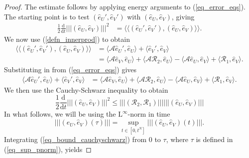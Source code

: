 \documentclass[12pt,a4paper]{article}
\numberwithin{equation}{section}
\theoremstyle{definition}
\newcommand{\pnorm}[1]{\left|\left|\left|#1\right|\right|\right|}
\newcommand{\leb}{\text{L}}
\newcommand{\innerprod}[1]{\langle\langle#1\rangle\rangle}
\newcommand{\innerprodsingle}[1]{\langle#1\rangle}
\newcommand{\qp}[1]{\left(#1\right)}
\newcommand{\qb}[1]{\left[#1\right]}
\begin{document}
\begin{proof}
The estimate follows by applying energy arguments to (\ref{eq_error_eqs}).  The starting point is to test $\qp{\hat{e}_U', \hat{e}_V'}$ with $\qp{\hat{e}_U, \hat{e}_V}$, giving
\begin{equation}
\begin{aligned}
\frac{1}{2}\frac{\mathrm{d}}{\mathrm{d}t}\pnorm{\qp{\hat{e}_U,\hat{e}_V}}^2
    &=\innerprod{\qp{\hat{e}_U', \hat{e}_V'}, \qp{\hat{e}_U, \hat{e}_V}}.
\end{aligned}
\end{equation}
We now use (\ref{defn_innerprod}) to obtain 
\begin{equation}
\begin{aligned}
\innerprod{\qp{\hat{e}_U', \hat{e}_V'}, \qp{\hat{e}_U, \hat{e}_V}}
&=\innerprodsingle{\mathcal{A}\hat{e}_U',\hat{e}_U}+\innerprodsingle{\hat{e}_V',\hat{e}_V}\\
&=\innerprodsingle{\mathcal{A}\hat{e}_V,\hat{e}_U}
+\innerprodsingle{\mathcal{A}\mathcal{R}_2,\hat{e}_U}
-\innerprodsingle{\mathcal{A}\hat{e}_U,\hat{e}_V}
+\innerprodsingle{\mathcal{R}_1,\hat{e}_V}.
\end{aligned}
\end{equation}
Substituting in from (\ref{eq_error_eqs}) gives 
\begin{equation}
\begin{aligned}
\innerprodsingle{\mathcal{A}\hat{e}_U',\hat{e}_U}+\innerprodsingle{\hat{e}_V',\hat{e}_V}&
=\innerprodsingle{\mathcal{A}\hat{e}_V,\hat{e}_U}
+\innerprodsingle{\mathcal{A}\mathcal{R}_2,\hat{e}_U}
-\innerprodsingle{\mathcal{A}\hat{e}_U,\hat{e}_V}
+\innerprodsingle{\mathcal{R}_1,\hat{e}_V}.
\end{aligned}
\end{equation}
We then use the Cauchy-Schwarz inequality to obtain
\begin{equation}\label{eq_bound_cauchyschwarz}
\frac{1}{2}\frac{\mathrm{d}}{\mathrm{d}t}\pnorm{\qp{\hat{e}_U,\hat{e}_V}}^2
  \leq  \pnorm{\qp{\mathcal{R}_2,\mathcal{R}_1}} \pnorm{\qp{\hat{e}_U,\hat{e}_V}}
\end{equation}
In what follows, we will be using the $\leb^\infty$-norm in time
\begin{equation}\label{eq_sup_pnorm}
\pnorm{\qp{\hat{e}_U, \hat{e}_V}\qp{\tau}}=\sup_{t\in\qb{0,t^N}}\pnorm{\qp{\hat{e}_U, \hat{e}_V}\qp{t}}.
\end{equation}
Integrating (\ref{eq_bound_cauchyschwarz}) from $0$ to $\tau$, where $\tau$ is defined in (\ref{eq_sup_pnorm}), yields

\end{proof}
\end{document}
